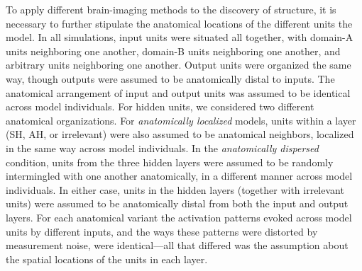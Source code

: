 To apply different brain-imaging methods to the discovery of structure, it is necessary to further stipulate the anatomical locations of the different units the model. In all simulations, input units were situated all together, with domain-A units neighboring one another, domain-B units neighboring one another, and arbitrary units neighboring one another. Output units were organized the same way, though outputs were assumed to be anatomically distal to inputs. The anatomical arrangement of input and output units was assumed to be identical across model individuals. For hidden units, we considered two different anatomical organizations. For {\em anatomically localized} models, units within a layer (SH, AH, or irrelevant) were also assumed to be anatomical neighbors, localized in the same way across model individuals. In the {\em anatomically dispersed} condition, units from the three hidden layers were assumed to be randomly intermingled with one another anatomically, in a different manner across model individuals. In either case, units in the hidden layers (together with irrelevant units) were assumed to be anatomically distal from both the input and output layers. For each anatomical variant the activation patterns evoked across model units by different inputs, and the ways these patterns were distorted by measurement noise, were identical---all that differed was the assumption about the spatial locations of the units in each layer.

